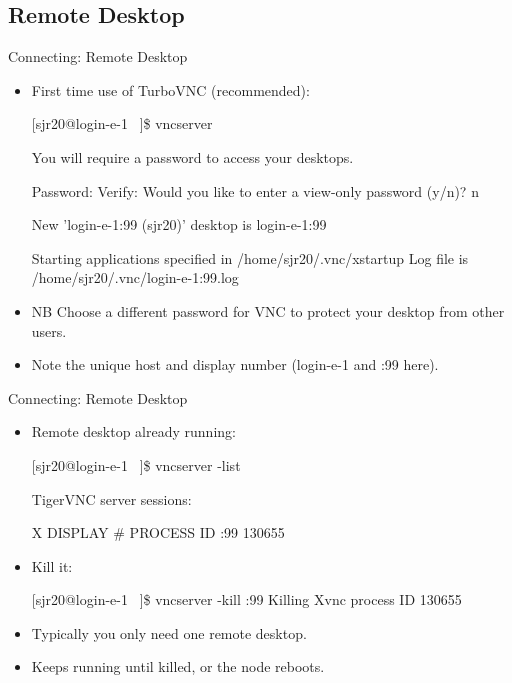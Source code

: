 \subsection{Remote Desktop}
\begin{frame}[fragile]{Connecting: Remote Desktop}
\begin{itemize}
\item First time use of TurboVNC (recommended):
\begin{semiverbatim}
\footnotesize
[sjr20@login-e-1 ~]\$ vncserver

You will require a password to access your desktops.

Password: 
Verify:   
Would you like to enter a view-only password (y/n)? n

New 'login-e-1:99 (sjr20)' desktop is {\color{red}login-e-1:99}

Starting applications specified in /home/sjr20/.vnc/xstartup
Log file is /home/sjr20/.vnc/login-e-1:99.log
\end{semiverbatim}
\item{NB Choose a \alert{different} password for VNC to protect your desktop from other users.}
\item{Note the unique host and display number ({\color{red}login-e-1} and {\color{red}:99} here).}
\end{itemize}
\end{frame}

\begin{frame}[fragile]{Connecting: Remote Desktop}
\begin{itemize}
\item Remote desktop already running:
\begin{semiverbatim}
\footnotesize
[sjr20@login-e-1 ~]\$ vncserver -list

TigerVNC server sessions:

X DISPLAY #     PROCESS ID
:99             130655
\end{semiverbatim}
\smallskip\item Kill it:
\begin{semiverbatim}
\footnotesize
[sjr20@login-e-1 ~]\$ vncserver -kill :99
Killing Xvnc process ID 130655
\end{semiverbatim}
\smallskip\item\alert{Typically you only need {\color{red}one} remote desktop.}
\item\alert{Keeps running until killed, or the node reboots.}
\end{itemize}
\end{frame}

